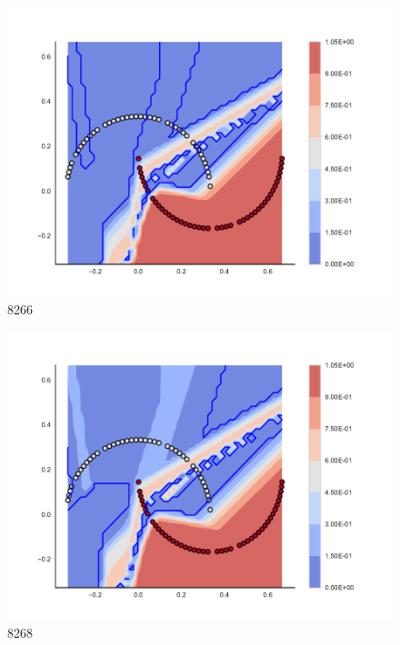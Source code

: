 \begin{subfigure}[b]{0.09\textwidth}
    \includegraphics[clip, trim=2.35cm 1.75cm 4.5cm 0cm,width=\textwidth]{img/convergence/8266.pdf}
    \caption{8266}
    \label{fig:convergence_8266}
\end{subfigure}
%
\begin{subfigure}[b]{0.09\textwidth}
    \includegraphics[clip, trim=2.35cm 1.75cm 4.5cm 0cm,width=\textwidth]{img/convergence/8268.pdf}
    \caption{8268}
    \label{fig:convergence_8268}
\end{subfigure}
%
